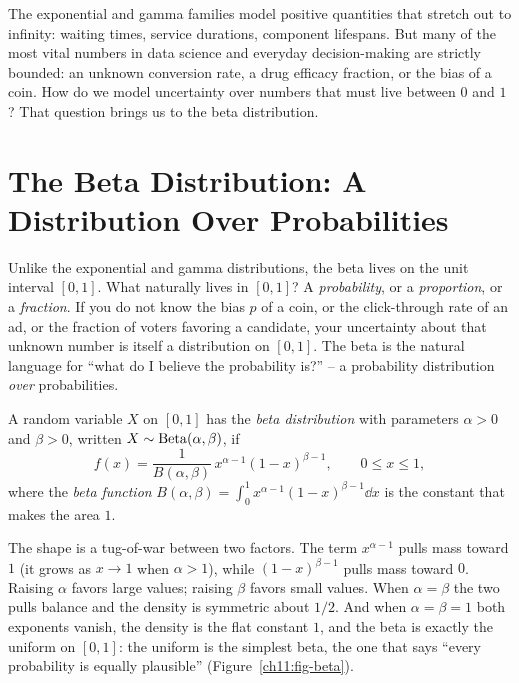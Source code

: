 The exponential and gamma families model positive quantities that stretch out to
infinity: waiting times, service durations, component lifespans. But many of the
most vital numbers in data science and everyday decision-making are strictly
bounded: an unknown conversion rate, a drug efficacy fraction, or the bias of a
coin. How do we model uncertainty over numbers that must live between $0$ and
$1$? That question brings us to the beta distribution.

\section{The Beta Distribution: A Distribution Over Probabilities}
\label{ch11:beta}
\begin{intuitionbox}
Unlike the exponential and gamma distributions, the
beta lives on the unit interval $[0,1]$.
What naturally lives in $[0,1]$? A \emph{probability}, or a \emph{proportion}, or
a \emph{fraction}. If you do not know the bias $p$ of a coin, or the click-through
rate of an ad, or the fraction of voters favoring a candidate, your uncertainty
about that unknown number is itself a distribution on $[0,1]$. The beta is the
natural language for ``what do I believe the probability is?'' -- a probability
distribution \emph{over} probabilities.
\end{intuitionbox}
\begin{definition}
\label{ch11:def-beta}
A random variable $X$ on $[0,1]$ has the \emph{beta distribution} with parameters
$\alpha > 0$ and $\beta > 0$, written $X\sim\operatorname{Beta}(\alpha,\beta)$, if
\[
  f(x) = \frac{1}{B(\alpha,\beta)}\,x^{\alpha-1}(1-x)^{\beta-1},
  \qquad 0 \le x \le 1,
\]
where the \emph{beta function} $B(\alpha,\beta) = \int_0^1
x^{\alpha-1}(1-x)^{\beta-1}\dd x$ is the constant that makes the area $1$.
\end{definition}
The shape is a tug-of-war between two factors. The term $x^{\alpha-1}$ pulls
mass toward $1$ (it grows as $x\to1$ when $\alpha>1$), while $(1-x)^{\beta-1}$
pulls mass toward $0$. Raising $\alpha$ favors large values; raising $\beta$
favors small values. When $\alpha=\beta$ the two pulls balance and the density
is symmetric about $1/2$. And when $\alpha=\beta=1$ both exponents vanish, the
density is the flat constant $1$, and the beta is exactly the uniform on
$[0,1]$: the uniform is the simplest beta, the one that says ``every probability
is equally plausible'' (Figure~\ref{ch11:fig-beta}).
